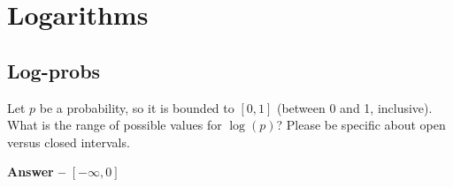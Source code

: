 \documentclass[11pt,letterpaper]{article}
\theoremstyle{definition}
\begin{document}
%
%
%
%

\section{Logarithms}

\subsection{Log-probs}
Let $p$ be a probability, so it is bounded to $[0,1]$ (between 0 and 1, inclusive).
What is the range of possible values for $\log(p)$?  Please be specific about open versus closed intervals.

\textbf{ Answer -- }$[-\infty, 0]$
\end{document}
